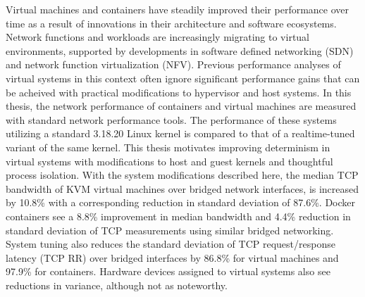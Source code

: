 Virtual machines and containers have steadily improved their performance over time as a result of innovations in their architecture and software ecosystems.
Network functions and workloads are increasingly migrating to virtual environments, supported by developments in software defined networking (SDN) and network function virtualization (NFV).
Previous performance analyses of virtual systems in this context often ignore significant performance gains that can be acheived with practical modifications to hypervisor and host systems.
In this thesis, the network performance of containers and virtual machines are measured with standard network performance tools.
The performance of these systems utilizing a standard 3.18.20 Linux kernel is compared to that of a realtime-tuned variant of the same kernel.  
This thesis motivates improving determinism in virtual systems with modifications to host and guest kernels and thoughtful process isolation. 
With the system modifications described here, the median TCP bandwidth of KVM virtual machines over bridged network interfaces, is increased by 10.8\% with a corresponding reduction in standard deviation of 87.6\%.
Docker containers see a 8.8\% improvement in median bandwidth and 4.4\% reduction in standard deviation of TCP measurements using similar bridged networking.
System tuning also reduces the standard deviation of TCP request/response latency (TCP RR) over bridged interfaces by 86.8\% for virtual machines and 97.9\% for containers.
Hardware devices assigned to virtual systems also see reductions in variance, although not as noteworthy.


